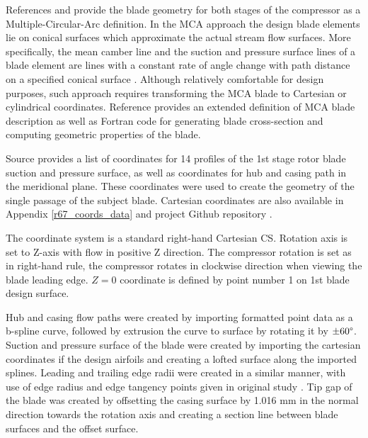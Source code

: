 References \citep{r67design} and \citep{r67performance} provide the blade geometry for both stages of the compressor as a Multiple-Circular-Arc definition. In the MCA approach the design blade elements lie on conical surfaces which approximate the actual stream flow surfaces. More specifically, the mean camber line and the suction and pressure surface lines of a blade element are lines with a constant rate of angle change with path distance on a specified conical surface \citep{bladecompose}. Although relatively comfortable for design purposes, such approach requires transforming the MCA blade to Cartesian or cylindrical coordinates. Reference \citep{bladecompose} provides an extended definition of MCA blade description as well as Fortran code for generating blade cross-section and computing geometric properties of the blade.

Source \citep{r67laser} provides a list of coordinates for 14 profiles of the 1st stage rotor blade suction and pressure surface, as well as coordinates for hub and casing path in the meridional plane. These coordinates were used to create the geometry of the single passage of the subject blade. Cartesian coordinates are also available in Appendix \ref{r67_coords_data} and project Github repository \citep{github}.

The coordinate system is a standard right-hand Cartesian CS. Rotation axis is set to Z-axis with flow in positive Z direction. The compressor rotation is set as in right-hand rule, the compressor rotates in clockwise direction when viewing the blade leading edge. $Z = 0$ coordinate is defined by point number 1 on 1st blade design surface.


Hub and casing flow paths were created by importing formatted point data as a \mbox{b-spline} curve, followed by extrusion the curve to surface by rotating it by $\pm 60 \degree$. Suction and pressure surface of the blade were created by importing the cartesian coordinates if the design airfoils and creating a lofted surface along the imported splines. Leading and trailing edge radii were created in a similar manner, with use of edge radius and edge tangency points given in original study \citep{r67laser}. Tip gap of the blade was created by offsetting the casing surface by 1.016 mm in the normal direction towards the rotation axis and creating a section line between blade surfaces and the offset surface.

